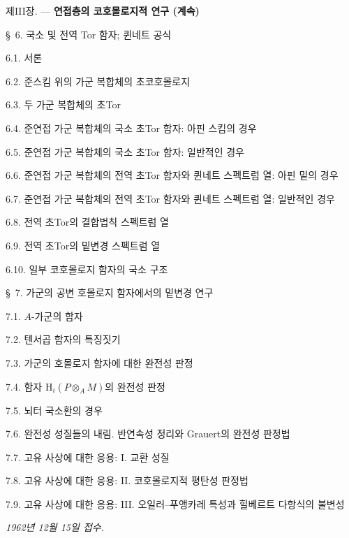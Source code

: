 \begin{flushleft}
\textsc{제III장.} --- \textbf{연접층의 코호몰로지적 연구 (계속)} 

\medskip
\S~6. 국소 및 전역 Tor 함자; 퀸네트 공식 

6.1. 서론 

6.2. 준스킴 위의 가군 복합체의 초코호몰로지 

6.3. 두 가군 복합체의 초Tor 

6.4. 준연접 가군 복합체의 국소 초Tor 함자: 아핀 스킴의 경우 

6.5. 준연접 가군 복합체의 국소 초Tor 함자: 일반적인 경우 

6.6. 준연접 가군 복합체의 전역 초Tor 함자와 퀸네트 스펙트럼 열:
아핀 밑의 경우 

6.7. 준연접 가군 복합체의 전역 초Tor 함자와 퀸네트 스펙트럼 열:
일반적인 경우 

6.8. 전역 초Tor의 결합법칙 스펙트럼 열 

6.9. 전역 초Tor의 밑변경 스펙트럼 열 

6.10. 일부 코호몰로지 함자의 국소 구조 

\medskip
\S~7. 가군의 공변 호몰로지 함자에서의 밑변경 연구 

7.1. $A$-가군의 함자 

7.2. 텐서곱 함자의 특징짓기 

7.3. 가군의 호몰로지 함자에 대한 완전성 판정 

7.4. 함자 $\mathrm H_i(P\otimes_A M)$의 완전성 판정 

7.5. 뇌터 국소환의 경우 

7.6. 완전성 성질들의 내림. 반연속성 정리와 Grauert의 완전성
판정법 

7.7. 고유 사상에 대한 응용: I. 교환 성질 

7.8. 고유 사상에 대한 응용: II. 코호몰로지적 평탄성 판정법 

7.9. 고유 사상에 대한 응용: III. 오일러--푸앵카레 특성과
힐베르트 다항식의 불변성 

\begin{flushright}
\emph{1962년 12월 15일 접수.}
\end{flushright}
\end{flushleft}

\clearpage
\thispagestyle{empty}
\null
\clearpage


